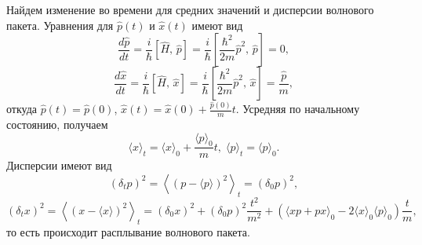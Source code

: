 \documentclass[a4paper
]{article}
\begin{document}
Найдем изменение во времени для средних значений и дисперсии волнового
пакета. Уравнения для $\hat p(t)$ и $\hat x(t)$ имеют вид
$$\frac{d\hat{p}}{dt}=\frac{i}{\hbar}[\hat{H}, \, \hat{p}]=
\frac{i}{\hbar}\left[\frac{\hbar^2}{2m}\hat{p}^2, \, \hat{p}\right]=0,$$
$$\frac{d\hat{x}}{dt}=\frac{i}{\hbar}[\hat{H}, \, \hat{x}]=
\frac{i}{\hbar}\left[\frac{\hbar^2}{2m}\hat{p}^2, \, \hat{x}\right]=
\frac{\hat{p}}{m},$$ откуда $\hat{p}(t)=\hat{p}(0)$, $\hat{x}(t)=
\hat{x}(0)+\frac{\hat{p}(0)}{m}t$. Усредняя по начальному состоянию,
получаем $$\langle x\rangle_t=\langle x\rangle_0+\frac{\langle p\rangle
_0}{m}t, \; \langle p\rangle_t=\langle p\rangle_0.$$ Дисперсии имеют
вид $$(\delta_t p)^2=\left\langle(p-\langle p\rangle)^2\right\rangle_t
=(\delta_0 p)^2,$$ $$(\delta_t x)^2=\left\langle(x-\langle x\rangle)^2
\right\rangle_t=(\delta_0x)^2+(\delta_0p)^2\frac{t^2}{m^2}+\left(\langle
xp+px\rangle_0-2\langle x\rangle_0\langle p\rangle_0\right)\frac{t}{m},$$
то есть происходит расплывание волнового пакета.
\end{document}
